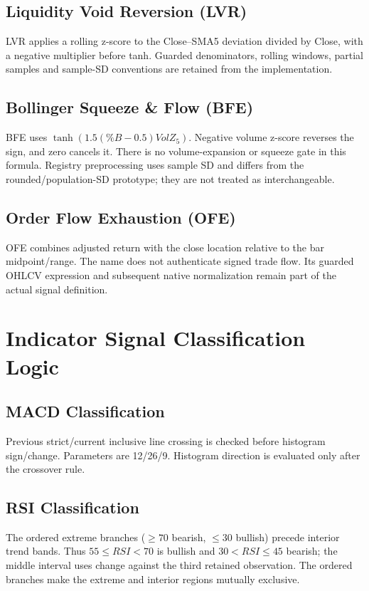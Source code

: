 \subsection{Liquidity Void Reversion (LVR)}
LVR applies a rolling z-score to the Close--SMA5 deviation divided by Close, with a negative multiplier before tanh. Guarded denominators, rolling windows, partial samples and sample-SD conventions are retained from the implementation.

\subsection{Bollinger Squeeze \& Flow (BFE)}
BFE uses $\tanh(1.5(\%B-0.5)VolZ_5)$. Negative volume z-score reverses the sign, and zero cancels it. There is no volume-expansion or squeeze gate in this formula. Registry preprocessing uses sample SD and differs from the rounded/population-SD prototype; they are not treated as interchangeable.

\subsection{Order Flow Exhaustion (OFE)}
OFE combines adjusted return with the close location relative to the bar midpoint/range. The name does not authenticate signed trade flow. Its guarded OHLCV expression and subsequent native normalization remain part of the actual signal definition.

\setcounter{table}{0}
\section{Indicator Signal Classification Logic}
\label{app:indicator_logic}

\subsection{MACD Classification}
Previous strict/current inclusive line crossing is checked before histogram sign/change. Parameters are 12/26/9. Histogram direction is evaluated only after the crossover rule.
\subsection{RSI Classification}
The ordered extreme branches ($\ge70$ bearish, $\le30$ bullish) precede interior trend bands. Thus $55\le RSI<70$ is bullish and $30<RSI\le45$ bearish; the middle interval uses change against the third retained observation. The ordered branches make the extreme and interior regions mutually exclusive.
